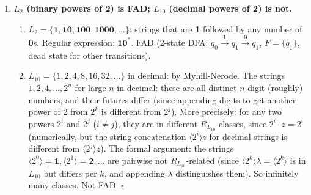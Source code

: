 \begin{enumerate}[{2.}1.]
\item \textbf{$L_2$ (binary powers of 2) is FAD; $L_{10}$ (decimal powers of 2) is not.}

\begin{enumerate}
\item $L_2=\{\mathbf{1},\mathbf{10},\mathbf{100},\mathbf{1000},\ldots\}$: strings that are \textbf{1} followed by any number of \textbf{0}s. Regular expression: $\mathbf{1}\mathbf{0}^*$. FAD (2-state DFA: $q_0\xrightarrow{\mathbf{1}}q_1\xrightarrow{\mathbf{0}}q_1$, $F=\{q_1\}$, dead state for other transitions).

\item $L_{10}=\{1,2,4,8,16,32,\ldots\}$ in decimal: by Myhill-Nerode. The strings $1,2,4,\ldots,2^n$ for large $n$ in decimal: these are all distinct $n$-digit (roughly) numbers, and their futures differ (since appending digits to get another power of 2 from $2^k$ is different from $2^j$). More precisely: for any two powers $2^i$ and $2^j$ ($i\neq j$), they are in different $R_{L_{10}}$-classes, since $2^i\cdot z=2^i$ (numerically, but the string concatenation $\langle 2^i\rangle z$ for decimal strings is different from $\langle 2^j\rangle z$). The formal argument: the strings $\langle 2^0\rangle=\mathbf{1},\langle 2^1\rangle=\mathbf{2},\ldots$ are pairwise not $R_{L_{10}}$-related (since $\langle 2^k\rangle\lambda=\langle 2^k\rangle$ is in $L_{10}$ but differs per $k$, and appending $\lambda$ distinguishes them). So infinitely many classes. Not FAD. $\square$
\end{enumerate}

\end{enumerate}
